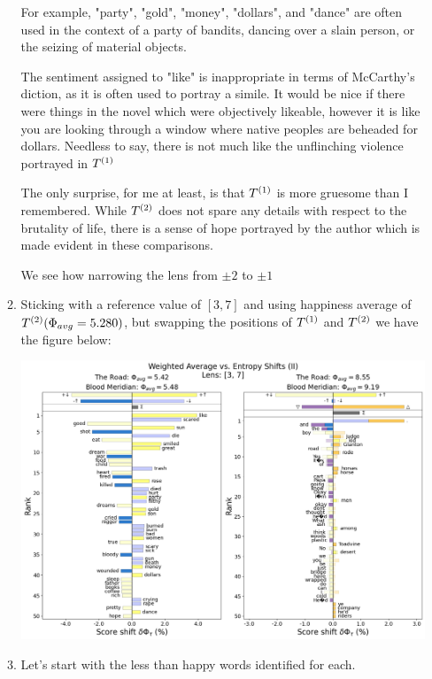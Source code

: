 \begin{enumerate}
\begin{enumerate}[wide, labelwidth=!, labelindent=0pt]
    For example, "party", "gold", "money", "dollars", and "dance" are often used in the context of a party of bandits, dancing over a slain person, or the seizing of material objects.

    The sentiment assigned to "like" is inappropriate in terms of McCarthy's diction, as it is often used to portray a simile. It would be nice if there were things in the novel which were objectively likeable, however it is like you are looking through a window where native peoples are beheaded for dollars. Needless to say, there is not much like the unflinching violence portrayed in $T^{(1)}$

    The only surprise, for me at least, is that $T^{(1)}$ is more gruesome than I remembered. While $T^{(2)}$ does not spare any details with respect to the brutality of life, there is a sense of hope portrayed by the author which is made evident in these comparisons.

    We see how narrowing the lens from $\pm 2$ to $\pm 1$
    
  \item
    Sticking with a reference value of $[3, 7]$ and using happiness average of $T^{(2)} (\Phi_{avg} = 5.280)$, but swapping the positions of $T^{(1)}$ and $T^{(2)}$ we have the figure below:

    \begin{center}
        \includegraphics[width=\linewidth]{figures/21_1_c.png}
    \end{center}
    
  \item
    Let's start with the less than happy words identified for each.


\end{enumerate}
\end{enumerate}
